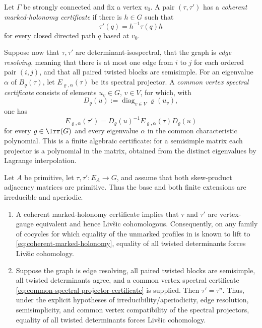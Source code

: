 \begin{definition}
  \label{def:inverse-rigidity-certificates}
  Let \(\Gamma\) be strongly connected and fix a vertex \(v_0\).
  A pair \((\tau,\tau')\) has a \emph{coherent marked-holonomy certificate}
  if there is \(h\in G\) such that
  \begin{equation}\label{eq:coherent-marked-holonomy}
    \tau'(q)=h^{-1}\tau(q)h
  \end{equation}
  for every closed directed path \(q\) based at \(v_0\).

  Suppose now that \(\tau,\tau'\) are determinant-isospectral, that the graph
  is \emph{edge resolving}, meaning that there is at most one edge from \(i\)
  to \(j\) for each ordered pair \((i,j)\), and that all paired twisted blocks
  are semisimple.  For an eigenvalue \(\alpha\)
  of \(B_\varrho(\tau)\), let \(E_{\varrho,\alpha}(\tau)\) be its spectral
  projector.  A \emph{common vertex spectral certificate} consists of
  elements \(u_v\in G\), \(v\in V\), for which, with
  \[
    D_\varrho(u):=\operatorname{diag}_{v\in V}\varrho(u_v),
  \]
  one has
  \begin{equation}\label{eq:common-spectral-projector-certificate}
    E_{\varrho,\alpha}(\tau')
    =D_\varrho(u)^{-1}E_{\varrho,\alpha}(\tau)D_\varrho(u)
  \end{equation}
  for every \(\varrho\in\Irr(G)\) and every eigenvalue \(\alpha\) in the
  common characteristic polynomial.  This is a finite algebraic
  certificate: for a semisimple matrix each projector is a polynomial in the
  matrix, obtained from the distinct eigenvalues by Lagrange interpolation.
\end{definition}

\begin{theorem}
  \label{thm:inverse-rigidity-under-certificate}
  Let \(A\) be primitive, let \(\tau,\tau':E_A\to G\), and assume that both
  skew-product adjacency matrices are primitive.  Thus the base and both
  finite extensions are irreducible and aperiodic.
  \begin{enumerate}[label=\textup{(\alph*)},leftmargin=*]
    \item A coherent marked-holonomy certificate implies that \(\tau\) and
    \(\tau'\) are vertex-gauge equivalent and hence Liv\v{s}ic cohomologous.
    Consequently, on any family of cocycles for which equality of the
    unmarked profiles in  is known to
    lift to \eqref{eq:coherent-marked-holonomy}, equality of all twisted
    determinants forces Liv\v{s}ic cohomology.
    \item Suppose the graph is edge resolving, all paired twisted blocks are
    semisimple, all twisted determinants agree, and a common vertex spectral
    certificate \eqref{eq:common-spectral-projector-certificate} is supplied.
    Then \(\tau'=\tau^u\).  Thus, under the explicit hypotheses of
    irreducibility/aperiodicity, edge resolution, semisimplicity, and common
    vertex compatibility of the spectral projectors, equality of all twisted
    determinants forces Liv\v{s}ic cohomology.
  \end{enumerate}
\end{theorem}


